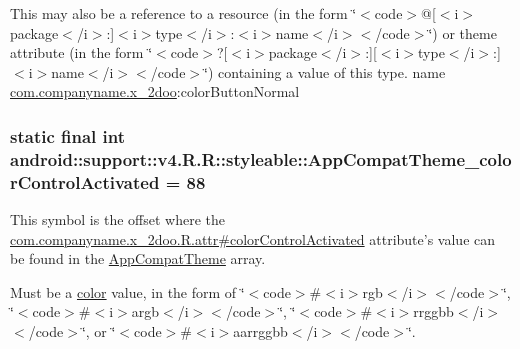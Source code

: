 This may also be a reference to a resource (in the form \char`\"{}$<$code$>$@\mbox{[}$<$i$>$package$<$/i$>$:\mbox{]}$<$i$>$type$<$/i$>$:$<$i$>$name$<$/i$>$$<$/code$>$\char`\"{}) or theme attribute (in the form \char`\"{}$<$code$>$?\mbox{[}$<$i$>$package$<$/i$>$:\mbox{]}\mbox{[}$<$i$>$type$<$/i$>$:\mbox{]}$<$i$>$name$<$/i$>$$<$/code$>$\char`\"{}) containing a value of this type.  name \hyperlink{namespacecom_1_1companyname_1_1x__2doo}{com.companyname.x\_\-2doo}:colorButtonNormal \hypertarget{classandroid_1_1support_1_1v4_1_1_r_1_1styleable_2d7dc080e71e4c68a0321538983ca317}{
\subsubsection[{AppCompatTheme\_\-colorControlActivated}]{\setlength{\rightskip}{0pt plus 5cm}static final int android::support::v4.R.R::styleable::AppCompatTheme\_\-colorControlActivated = 88}}
\label{classandroid_1_1support_1_1v4_1_1_r_1_1styleable_2d7dc080e71e4c68a0321538983ca317}


This symbol is the offset where the \hyperlink{classcom_1_1companyname_1_1x__2doo_1_1_r_1_1attr_1c1afce4db901572b107eca98353455c}{com.companyname.x\_\-2doo.R.attr\#colorControlActivated} attribute's value can be found in the \hyperlink{classandroid_1_1support_1_1v4_1_1_r_1_1styleable_0873e92ba21076bb5a4aeadeb7f5779f}{AppCompatTheme} array.

Must be a \hyperlink{classandroid_1_1support_1_1v4_1_1_r_1_1color}{color} value, in the form of \char`\"{}$<$code$>$\#$<$i$>$rgb$<$/i$>$$<$/code$>$\char`\"{}, \char`\"{}$<$code$>$\#$<$i$>$argb$<$/i$>$$<$/code$>$\char`\"{}, \char`\"{}$<$code$>$\#$<$i$>$rrggbb$<$/i$>$$<$/code$>$\char`\"{}, or \char`\"{}$<$code$>$\#$<$i$>$aarrggbb$<$/i$>$$<$/code$>$\char`\"{}. 

